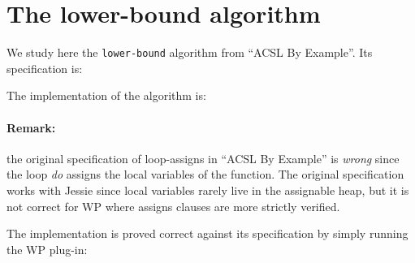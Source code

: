 \clearpage
\section{The \textsf{lower-bound} algorithm}

We study here the \texttt{lower-bound}
algorithm from ``ACSL By Example''. 
Its specification is:


The implementation of the algorithm is:


\paragraph{Remark:} the original specification of loop-assigns in ``ACSL By Example'' 
is \emph{wrong} since the loop \emph{do} assigns the local variables
of the function. The original specification works with \textsf{Jessie}
since local variables rarely live in the assignable heap, but it is
not correct for \textsf{WP} where assigns clauses are more strictly
verified.

The implementation is proved correct against its specification by
simply running the \textsf{WP} plug-in:

